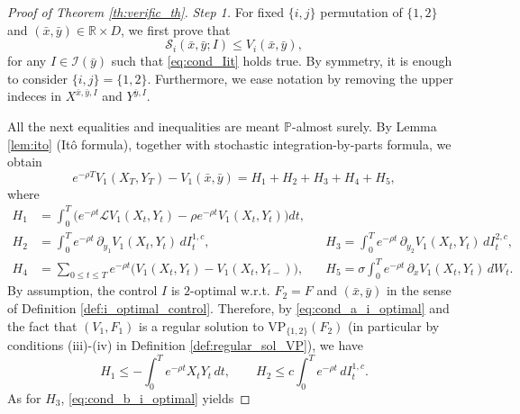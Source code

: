 \documentclass[10pt]{article}
\numberwithin{equation}{section}
\theoremstyle{plain}
\numberwithin{theorem}{section}
\theoremstyle{definition}
\def \R {\mathbb{R}}
\newcommand{\<}{\langle}
\renewcommand{\>}{\rangle}
\renewcommand{\(}{\left(}
\renewcommand{\)}{\right)}
\newcommand\Pb{\mathbb{P}}
\newcommand\contr{{\bf I}}
\def \R  {{\mathbb {R}}}
\def \R {{\mathbb {R}}}
\def\cI{{\mathcal I}}
\def\cL{{\mathcal L}}
\def\cS{{\mathcal S}}
\begin{document}
{{{\begin{proof}[Proof of Theorem \ref{th:verific_th}]%
\emph{Step 1.} For fixed $\{i,j\}$ permutation of $\{1,2\}$ and $(\bar{x},\bar{y})\in \R\times {D}$, we first prove that
\begin{equation}\label{eq:prof_ver_part1}
\cS_i(\bar{x},\bar{y}; I) \leq V_i(\bar{x},\bar{y}),
\end{equation}
for any $I\in \cI(\bar{y})$ such that \eqref{eq:cond_Iit} holds true. 
By symmetry, it is enough to consider $\{ i,j \} = \{1,2\}$. Furthermore, we ease notation by removing the upper indeces in $X^{\bar{x},\bar{y},I}$ and $Y^{\bar{y},I}$.

All the next equalities and inequalities are meant $\Pb$-almost surely. By Lemma \ref{lem:ito} (It\^o formula), together with stochastic integration-by-parts formula, we obtain
\begin{equation}%
e^{- \rho  T } V_1(X_{ T }, Y_{ T }) - V_1(\bar{x}, \bar{y}) = H_1 + H_2 + H_3 + H_4 + H_5,
\end{equation}
where
\begin{align}%
H_1&= \int_{0}^{ T } \big( e^{-\rho  t} \cL V_1 (X_t , Y_t ) -\rho e^{-\rho t } V_1(X_{t}, Y_{t})  \big) dt ,\\
H_2&= \int_{0}^{ T } e^{-\rho  t}\, \partial_{y_1} V_1 (X_t , Y_t )\, d I^{1,c}_t,&&
H_3= \int_{0}^{ T } e^{-\rho  t}\, \partial_{y_2} V_1 (X_t , Y_t )\, d I^{2,c}_t ,\\
H_4&= \sum_{0\leq t \leq  T } e^{-\rho t} \big( V_1 (X_t , Y_t ) - V_1 (X_t , Y_{t-} )  \big), &&
H_5=\sigma \int_{0}^{ T } e^{-\rho  t}\, \partial_x V_1 (X_t , Y_t )\, d W_t . 
\end{align}
By assumption, the control $I$ is $2$-optimal w.r.t. $F_2=F$ and $(\bar x, \bar y)$ in the sense of Definition \ref{def:i_optimal_control}. Therefore, by \eqref{eq:cond_a_i_optimal} and the fact that $(V_1,F_1)$ is a regular solution to $\text{VP}_{\{1,2\}}(F_2)$ (in particular by conditions (iii)-(iv) in Definition \ref{def:regular_sol_VP}), we have
\begin{equation}\label{eq:ineq_prof_verif_1}
H_1 \leq - \int_{0}^{ T } e^{-\rho  t} X_t  Y_t \,  dt, \qquad %
H_2 \leq c \int_{0}^{ T } e^{-\rho  t} \, d I^{1,c}_t.%
\end{equation}
As for $H_3$, \eqref{eq:cond_b_i_optimal} yields

\end{proof}}}}
\end{document}
